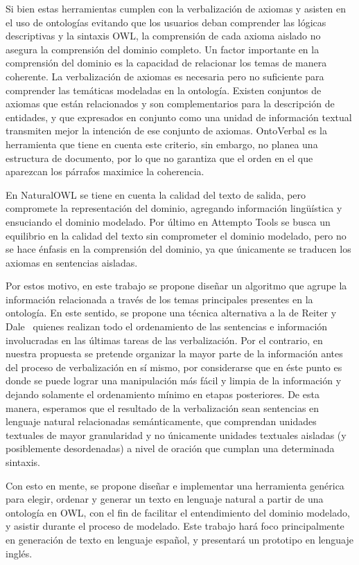 Si bien estas herramientas cumplen con la verbalización de axiomas y asisten en el uso de ontologías evitando que los usuarios deban comprender las lógicas descriptivas y la sintaxis OWL, la comprensión de cada axioma aislado no asegura la comprensión del dominio completo. Un factor importante en la comprensión del dominio es la capacidad de relacionar los temas de manera coherente. La verbalización de axiomas es necesaria pero no suficiente para comprender las temáticas modeladas en la ontología. Existen conjuntos de axiomas que están relacionados y son complementarios para la descripción de entidades, y que expresados en conjunto como una unidad de información textual transmiten mejor la intención de ese conjunto de axiomas. OntoVerbal es la herramienta que tiene en cuenta este criterio, sin embargo, no planea una estructura de documento, por lo que no garantiza que el orden en el que aparezcan los párrafos maximice la coherencia.

En NaturalOWL se tiene en cuenta la calidad del texto de salida, pero compromete la representación del dominio, agregando información lingüística y ensuciando el dominio modelado. Por último en Attempto Tools se busca un equilibrio en la calidad del texto sin comprometer el dominio modelado, pero no se hace énfasis en la comprensión del dominio, ya que únicamente se traducen los axiomas en sentencias aisladas. 

Por estos motivo, en este trabajo se propone diseñar un algoritmo que agrupe la información relacionada a través de los temas principales presentes en la ontología. En este sentido, se propone una técnica alternativa a la de Reiter y Dale~\cite{reiter1997building} quienes realizan todo el ordenamiento de las sentencias e información involucradas en las últimas tareas de las verbalización. Por el contrario, en nuestra propuesta se pretende organizar la mayor parte de la información antes del proceso de verbalización en sí mismo, por considerarse que en éste punto es donde se puede lograr una manipulación más fácil y limpia de la información y dejando solamente el ordenamiento mínimo en etapas posteriores. De esta manera, esperamos que el resultado de la verbalización sean sentencias en lenguaje natural relacionadas semánticamente, que comprendan unidades textuales de mayor granularidad y no únicamente unidades textuales  aisladas (y posiblemente desordenadas) a nivel de oración  que cumplan una determinada sintaxis.

Con esto en mente, se propone diseñar e implementar una herramienta genérica para elegir, ordenar y generar un texto en lenguaje natural a partir de una ontología en OWL, con el fin de facilitar el entendimiento del dominio modelado, y asistir durante el proceso de modelado. Este trabajo hará foco principalmente en generación de texto en lenguaje español, y presentará un prototipo en lenguaje inglés.

